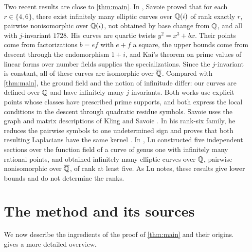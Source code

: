 Two recent results are close to \cref{thm:main}. In \cite[Theorem~1.1]{Savoie2026}, Savoie proved that for each $r\in\{4,6\}$, there exist infinitely many elliptic curves over $\mathbb Q(i)$ of rank exactly $r$, pairwise nonisomorphic over $\mathbb Q(i)$, not obtained by base change from $\mathbb Q$, and all with $j$-invariant $1728$. His curves are quartic twists $y^2=x^3+bx$. Their points come from factorizations $b=ef$ with $e+f$ a square, the upper bounds come from descent through the endomorphism $1+i$, and Kai's theorem \cite{Kai} on prime values of linear forms over number fields supplies the specializations. Since the $j$-invariant is constant, all of these curves are isomorphic over $\overline{\mathbb Q}$. Compared with \cref{thm:main}, the ground field and the notion of infinitude differ: our curves are defined over $\mathbb Q$ and have infinitely many $j$-invariants. Both works use explicit points whose classes have prescribed prime supports, and both express the local conditions in the descent through quadratic residue symbols. Savoie uses the graph and matrix descriptions of Kling and Savoie \cite[Theorem~5.2 of the cited preprint]{KlingSavoie2024}. In his rank-six family, he reduces the pairwise symbols to one undetermined sign and proves that both resulting Laplacians have the same kernel \cite[Lemmas~4.1--4.2]{Savoie2026}. In \cite[Proposition~6.1]{Lu2026}, Lu constructed five independent sections over the function field of a curve of genus one with infinitely many rational points, and obtained infinitely many elliptic curves over $\mathbb Q$, pairwise nonisomorphic over $\overline{\mathbb Q}$, of rank at least five. As Lu notes, these results give lower bounds and do not determine the ranks.

\section{The method and its sources}\label{sec:intro-method}

We now describe the ingredients of the proof of \cref{thm:main} and their origins.  gives a more detailed overview.

